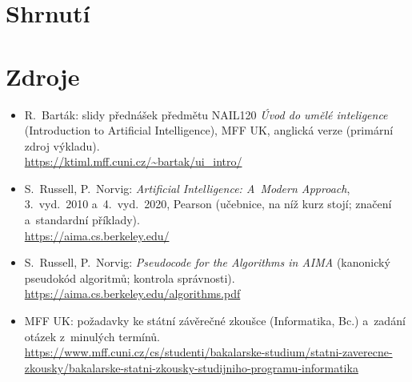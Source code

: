 \documentclass[11pt,a4paper]{article}
\begin{document}










\section*{Shrnutí}


\section*{Zdroje}

{\raggedright
\begin{itemize}
  \item R.~Barták: slidy přednášek předmětu NAIL120 \emph{Úvod do umělé inteligence} (Introduction to Artificial Intelligence), MFF UK, anglická verze (primární zdroj výkladu).\\ \url{https://ktiml.mff.cuni.cz/~bartak/ui_intro/}
  \item S.~Russell, P.~Norvig: \emph{Artificial Intelligence: A~Modern Approach}, 3.~vyd.\ 2010 a~4.~vyd.\ 2020, Pearson (učebnice, na níž kurz stojí; značení a~standardní příklady).\\ \url{https://aima.cs.berkeley.edu/}
  \item S.~Russell, P.~Norvig: \emph{Pseudocode for the Algorithms in AIMA} (kanonický pseudokód algoritmů; kontrola správnosti).\\ \url{https://aima.cs.berkeley.edu/algorithms.pdf}
  \item MFF UK: požadavky ke státní závěrečné zkoušce (Informatika, Bc.) a~zadání otázek z~minulých termínů.\\ \url{https://www.mff.cuni.cz/cs/studenti/bakalarske-studium/statni-zaverecne-zkousky/bakalarske-statni-zkousky-studijniho-programu-informatika}
\end{itemize}
\par}
\end{document}
